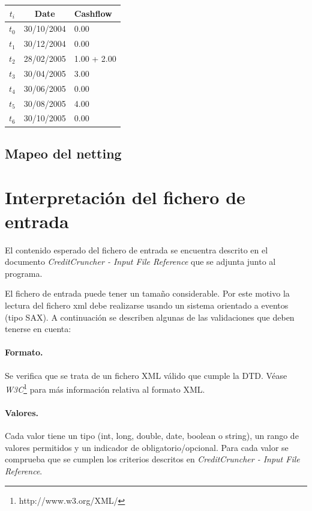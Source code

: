 \begin{center}
\begin{tabular}{c|c|l}
\textbf{$t_i$} & \textbf{Date} & \textbf{Cashflow} \\
\hline
$t_0$ & 30/10/2004 & 0.00 \\
$t_1$ & 30/12/2004 & 0.00 \\
$t_2$ & 28/02/2005 & 1.00 + 2.00 \\
$t_3$ & 30/04/2005 & 3.00 \\
$t_4$ & 30/06/2005 & 0.00 \\
$t_5$ & 30/08/2005 & 4.00 \\
$t_6$ & 30/10/2005 & 0.00 \\
\end{tabular}
\end{center}

\subsection{Mapeo del netting}



\section{Interpretaci\'on del fichero de entrada}

El contenido esperado del fichero de entrada se encuentra
descrito en el documento \emph{CreditCruncher - Input File Reference}
que se adjunta junto al programa.

El fichero de entrada puede tener un tama\~no considerable. Por
este motivo la lectura del fichero xml debe realizarse usando un
sistema orientado a eventos (tipo SAX). A continuaci\'on se
describen algunas de las validaciones que deben tenerse en cuenta:

\paragraph{Formato.} Se verifica que se trata de un fichero XML
v\'alido que cumple la DTD. V\'ease \emph{W3C}\footnote{http://www.w3.org/XML/}
para m\'as informaci\'on relativa al formato XML.

\paragraph{Valores.} Cada valor tiene un tipo (int, long, double,
date, boolean o string), un rango de valores permitidos y un
indicador de obligatorio/opcional. Para cada valor se comprueba
que se cumplen los criterios descritos en
\emph{CreditCruncher - Input File Reference}.

